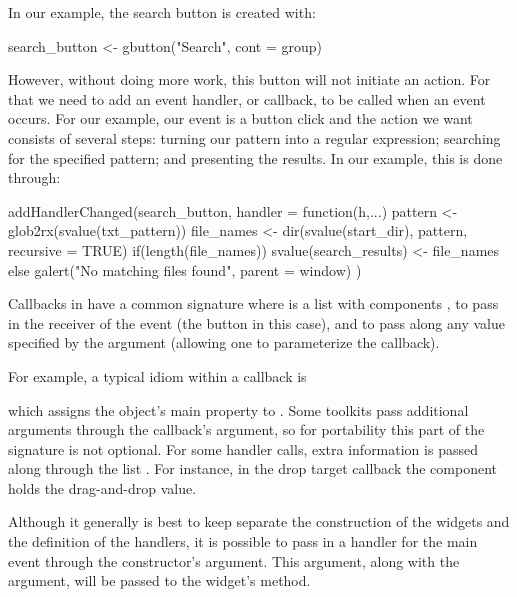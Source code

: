 In our example, the search button is created with:
\begin{Schunk}
\begin{Sinput}
 search_button <- gbutton("Search", cont = group)
\end{Sinput}
\end{Schunk}
%
However, without doing more work, this button will not initiate an
action. For that we need to add an event handler, or callback, to be
called when an event occurs. For our example, our event is a button
click and the action we want consists of several steps: turning our
pattern into a regular expression; searching for the specified
pattern; and presenting the results.  In our example, this is done
through:
\begin{Schunk}
\begin{Sinput}
 addHandlerChanged(search_button, handler = function(h,...) {
   pattern <- glob2rx(svalue(txt_pattern))
   file_names <- dir(svalue(start_dir), pattern, recursive = TRUE)
   if(length(file_names))
     svalue(search_results) <- file_names
   else
     galert("No matching files found", parent = window)
 })
\end{Sinput}
\end{Schunk}
%
Callbacks in  have a common signature 
where  is a list with components , to pass in the
receiver of the event (the button in this case), and  to
pass along any value specified by the  argument (allowing
one to parameterize the callback).

For example, a typical idiom within a callback is
\begin{Schunk}
\end{Schunk}
%
which assigns the object's main property to . Some toolkits pass
additional arguments through the callback's   argument, so
for portability this part of the signature is not optional. For some
handler calls, extra information is passed along through the list
. For instance, in the drop target callback the component
 holds the drag-and-drop value.




Although it generally is best to keep separate the construction of the
widgets and the definition of the handlers, it is possible to pass in
a handler for the main event through the constructor's 
argument. This argument, along with the  argument, will
be passed to the widget's  method. 



